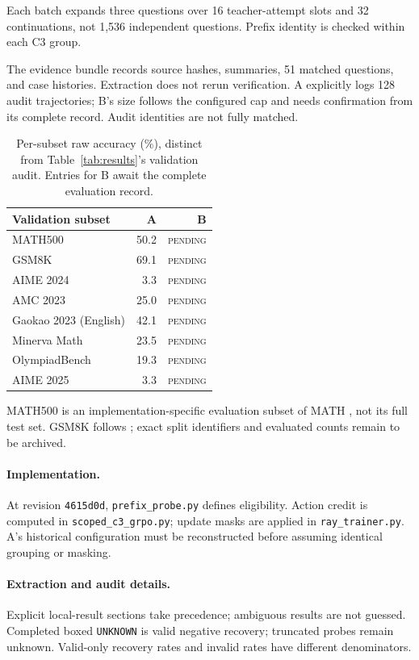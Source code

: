\documentclass[11pt]{article}
\newcommand{\pending}{\textcolor{blue!65!black}{\textsc{pending}}}
\begin{document}
Each batch expands three questions over 16 teacher-attempt slots and 32 continuations, not 1,536 independent questions. Prefix identity is checked within each C3 group.

The evidence bundle records source hashes, summaries, 51 matched questions, and case histories. Extraction does not rerun verification. A explicitly logs 128 audit trajectories; B's size follows the configured cap and needs confirmation from its complete record. Audit identities are not fully matched.

\begin{table}[ht]
\centering
\small
\begin{tabular}{@{}lrr@{}}
\toprule
Validation subset & A & B\\
\midrule
MATH500 & 50.2 & \pending\\
GSM8K & 69.1 & \pending\\
AIME 2024 & 3.3 & \pending\\
AMC 2023 & 25.0 & \pending\\
Gaokao 2023 (English) & 42.1 & \pending\\
Minerva Math & 23.5 & \pending\\
OlympiadBench & 19.3 & \pending\\
AIME 2025 & 3.3 & \pending\\
\bottomrule
\end{tabular}
\caption{Per-subset raw accuracy (\%), distinct from Table~\ref{tab:results}'s validation audit. Entries for B await the complete evaluation record.}
\end{table}

MATH500 is an implementation-specific evaluation subset of MATH \citep{hendrycks2021math}, not its full test set. GSM8K follows \citet{cobbe2021gsm8k}; exact split identifiers and evaluated counts remain to be archived.

\paragraph{Implementation.}
At revision \texttt{4615d0d}, \texttt{prefix\_probe.py} defines eligibility. Action credit is computed in \texttt{scoped\_c3\_grpo.py}; update masks are applied in \texttt{ray\_trainer.py}. A's historical configuration must be reconstructed before assuming identical grouping or masking.

\paragraph{Extraction and audit details.}
Explicit local-result sections take precedence; ambiguous results are not guessed. Completed boxed \texttt{UNKNOWN} is valid negative recovery; truncated probes remain unknown. Valid-only recovery rates and invalid rates have different denominators.
\end{document}

